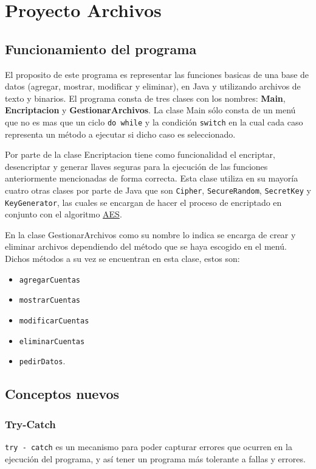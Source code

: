 \documentclass[a4paper, 12pt]{article}
\newcommand{\code}[1]{\colorbox{light-gray}{\texttt{#1}}}
\begin{document}
\section*{Proyecto Archivos}

\subsection*{Funcionamiento del programa}

El proposito de este programa es representar las funciones basicas de una base de datos (agregar, mostrar, modificar 
y eliminar), en Java y utilizando archivos de texto y binarios.
El programa consta de tres clases con los nombres: \textbf{Main}, \textbf{Encriptacion} y \textbf{GestionarArchivos}.
La clase Main sólo consta de un menú que no es mas que un ciclo \code{do while} y la condición \code{switch} en 
la cual cada caso representa un método a ejecutar si dicho caso es seleccionado.

Por parte de la clase Encriptacion tiene como funcionalidad el encriptar, desencriptar y generar llaves seguras para
la ejecución de las funciones anteriormente mencionadas de forma correcta. Esta clase utiliza en su mayoría cuatro otras
clases por parte de Java que son \code{Cipher}, \code{SecureRandom}, \code{SecretKey} y \code{KeyGenerator}, las cuales se
encargan de hacer el proceso de encriptado en conjunto con el algoritmo \hyperref[aes]{AES}.

En la clase GestionarArchivos como su nombre lo indica se encarga de crear y eliminar archivos dependiendo del método
que se haya escogido en el menú. Dichos métodos a su vez se encuentran en esta clase, estos son: 

\begin{itemize}
  \item \code{agregarCuentas}
  \item \code{mostrarCuentas}
  \item \code{modificarCuentas}
  \item \code{eliminarCuentas}
  \item \code{pedirDatos}.
\end{itemize}

\subsection*{Conceptos nuevos}

\subsubsection*{Try-Catch}
\code{try - catch} es un mecanismo para poder capturar errores que ocurren en la ejecución del programa, y así tener un programa
más tolerante a fallas y errores.
\end{document}
